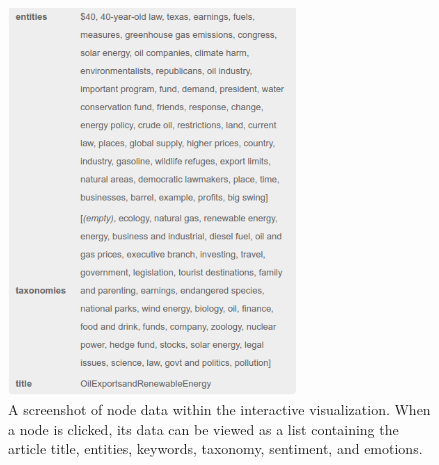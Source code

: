 \documentclass[12pt]{article}
\begin{document}
\begin{figure}[here]
\includegraphics[width=3in]{graph_node_screenshot}
\caption{A screenshot of node data within the interactive visualization. When a node is clicked, its data can be viewed as a list containing the article title, entities, keywords, taxonomy, sentiment, and emotions.}
\label{fig:graphNode}
\end{figure}
\end{document}
